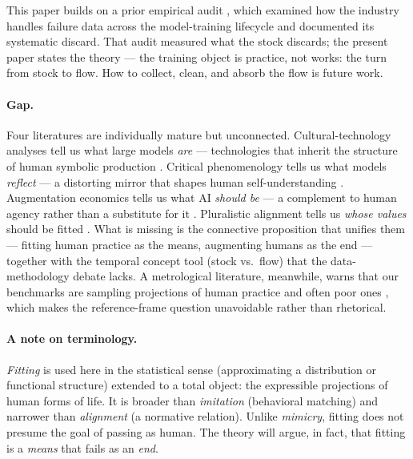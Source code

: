 \documentclass[10pt]{article}
\begin{document}
This paper builds on a prior empirical audit \cite{yu2026failure}, which examined how the industry handles failure data across the model-training lifecycle and documented its systematic discard. That audit measured what the stock discards; the present paper states the theory --- the training object is practice, not works: the turn from stock to flow. How to collect, clean, and absorb the flow is future work.

\paragraph{Gap.}
Four literatures are individually mature but unconnected. Cultural-technology analyses tell us what large models \emph{are} --- technologies that inherit the structure of human symbolic production \cite{farrell2025cultural}. Critical phenomenology tells us what models \emph{reflect} --- a distorting mirror that shapes human self-understanding \cite{vallor2024mirror}. Augmentation economics tells us what AI \emph{should be} --- a complement to human agency rather than a substitute for it \cite{brynjolfsson2022turing}. Pluralistic alignment tells us \emph{whose values} should be fitted \cite{gabriel2020values}. What is missing is the connective proposition that unifies them --- fitting human practice as the means, augmenting humans as the end --- together with the temporal concept tool (stock vs.\ flow) that the data-methodology debate lacks. A metrological literature, meanwhile, warns that our benchmarks are sampling projections of human practice and often poor ones \cite{salaudeen2025measurement}, which makes the reference-frame question unavoidable rather than rhetorical.

\paragraph{A note on terminology.}
\emph{Fitting} is used here in the statistical sense (approximating a distribution or functional structure) extended to a total object: the expressible projections of human forms of life. It is broader than \emph{imitation} (behavioral matching) and narrower than \emph{alignment} (a normative relation). Unlike \emph{mimicry}, fitting does not presume the goal of passing as human. The theory will argue, in fact, that fitting is a \emph{means} that fails as an \emph{end}.
\end{document}
